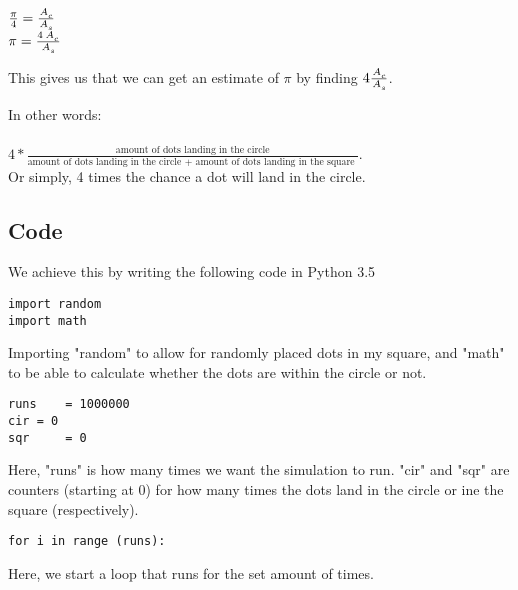 \documentclass{article}
\begin{document}
$\frac { \pi }  { 4 }
 = 
\frac { \prescript{}{}{A}^{}_{c} }  { \prescript{}{}{A}^{}_{s} }$ \\

$\pi
 = 
\frac { 4\prescript{}{}{A}^{}_{c} }  { \prescript{}{}{A}^{}_{s} }$

\hfill

This gives us that we can get an estimate of $\pi$ by finding
$4\frac { \prescript{}{}{A}^{}_{c} }  { \prescript{}{}{A}^{}_{s} }$.

In other words: \\ \\
$4 * \frac { \text{amount of dots landing in the circle} }  { \text{amount of dots landing in the circle + amount of dots landing in the square } }$. \\

Or simply, 4 times the chance a dot will land in the circle.

\hfill

\subsection{Code}

We achieve this by writing the following code in Python 3.5

\begin{mdframed}
\begin{lstlisting}
import random
import math
\end{lstlisting}
\end{mdframed}
Importing "random" to allow for randomly placed dots in my square,
and "math" to be able to calculate whether the dots are within the circle or not.

\hfill

\begin{mdframed}
\begin{lstlisting}
runs	= 1000000
cir	= 0
sqr 	= 0
\end{lstlisting}
\end{mdframed}
Here, "runs" is how many times we want the simulation to run.
"cir" and "sqr" are counters (starting at 0) for how many times the dots land in the circle or ine the square (respectively).

\hfill

\begin{mdframed}
\begin{lstlisting}
for i in range (runs):
\end{lstlisting}
\end{mdframed}
Here, we start a loop that runs for the set amount of times.
\end{document}
